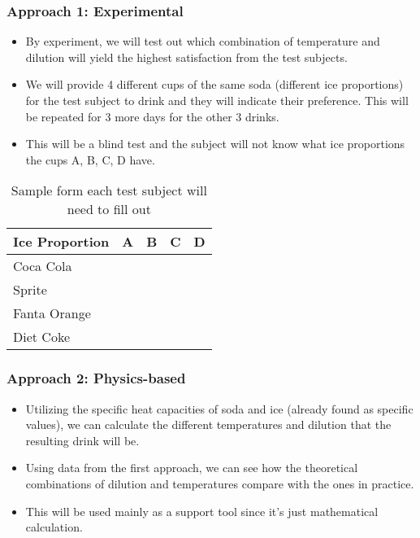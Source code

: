 \documentclass[compress,handout,10pt]{beamer}
\let\olditem\item
\renewcommand{\item}{\setlength{\itemsep}{0.5\baselineskip}\olditem}
\begin{document}
\begin{frame}
    \frametitle{Approach 1: Experimental}

\begin {itemize}
\item By experiment, we will test out which combination of temperature and dilution will yield the highest satisfaction from the test subjects.
\item We will provide 4 different cups of the same soda (different ice proportions) for the test subject to drink and they will indicate their preference. This will be repeated for 3 more days for the other 3 drinks.
\item This will be a blind test and the subject will not know what ice proportions the cups A, B, C, D have.
\end{itemize}
\vspace{6pt}

\begin{table}[ h]
\centering
\begin{tabular}{ l | c|c|c|c }
  Ice Proportion & A  & B & C & D \\
\hline  
Coca Cola & & & &\\ 
\hline  
Sprite & & & &\\ 
\hline  
Fanta Orange  & & & &\\ 
\hline  
Diet Coke & & & &\\ 
\hline  
   
 \end{tabular}
\caption{Sample form each test subject will need to fill out}

\end{table}

\end{frame}

\begin{frame}
    \frametitle{Approach 2: Physics-based}

\begin {itemize}
\item Utilizing the specific heat capacities of soda and ice (already found as specific values), we can calculate the different temperatures and dilution that the resulting drink will be.
\item Using data from the first approach, we can see how the theoretical combinations of dilution and temperatures compare with the ones in practice.
\item This will be used mainly as a support tool since it's just mathematical calculation.
\end{itemize}

\end{frame}
 
\end{document}

